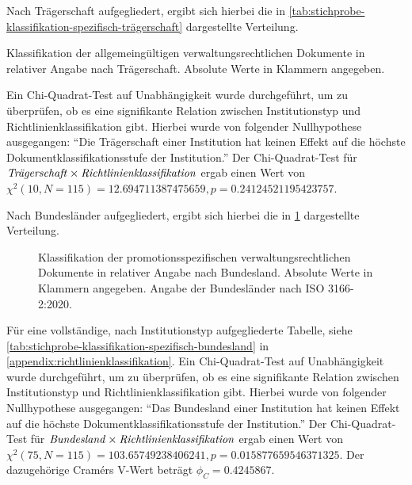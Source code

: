Nach Trägerschaft aufgegliedert, ergibt sich hierbei die in \cref{tab:stichprobe-klassifikation-spezifisch-trägerschaft} dargestellte Verteilung.
\begin{table}[!htbp]
	\caption{Klassifikation der allgemeingültigen verwaltungsrechtlichen Dokumente in relativer Angabe nach Trägerschaft. Absolute Werte in Klammern angegeben.}
    
	\label{tab:stichprobe-klassifikation-spezifisch-trägerschaft}
\end{table}
Ein Chi-Quadrat-Test auf Unabhängigkeit wurde durchgeführt, um zu überprüfen, ob es eine signifikante Relation zwischen Institutionstyp und Richtlinienklassifikation gibt.
Hierbei wurde von folgender Nullhypothese ausgegangen:
\enquote{Die Trägerschaft einer Institution hat keinen Effekt auf die höchste Dokumentklassifikationsstufe der Institution.}
Der Chi-Quadrat-Test für $\text{\textit{Trägerschaft}}\times\text{\textit{Richtlinienklassifikation}}$ ergab einen Wert von $\chi^2 (\num{10}, N = \num{115}) = \num[round-mode=places,round-precision=3]{12,694711387475659}, p = \num[round-mode=places,round-precision=3]{0,24124521195423757}$.

Nach Bundesländer aufgegliedert, ergibt sich hierbei die in \cref{fig:policy-klassifikation-spezifisch-absolut} dargestellte Verteilung.
\begin{figure}[!htbp]
    \centering
    \resizebox{\textwidth}{!}{}
    \caption{Klassifikation der promotionsspezifischen verwaltungsrechtlichen Dokumente in relativer Angabe nach Bundesland. Absolute Werte in Klammern angegeben. Angabe der Bundesländer nach ISO 3166-2:2020.~\autocite{ISO3166}}
    \label{fig:policy-klassifikation-spezifisch-absolut}
\end{figure}
Für eine vollständige, nach Institutionstyp aufgegliederte Tabelle, siehe \cref{tab:stichprobe-klassifikation-spezifisch-bundesland} in \cref{appendix:richtlinienklassifikation}.
Ein Chi-Quadrat-Test auf Unabhängigkeit wurde durchgeführt, um zu überprüfen, ob es eine signifikante Relation zwischen Institutionstyp und Richtlinienklassifikation gibt.
Hierbei wurde von folgender Nullhypothese ausgegangen:
\enquote{Das Bundesland einer Institution hat keinen Effekt auf die höchste Dokumentklassifikationsstufe der Institution.}
Der Chi-Quadrat-Test für $\text{\textit{Bundesland}}\times\text{\textit{Richtlinienklassifikation}}$ ergab einen Wert von $\chi^2 (\num{75}, N = \num{115}) = \num[round-mode=places,round-precision=3]{103,65749238406241}, p = \num[round-mode=places,round-precision=3]{0,015877659546371325}$.
Der dazugehörige Cramérs V-Wert beträgt $\phi_C=\num[round-mode=places,round-precision=3]{0.4245867}$.


